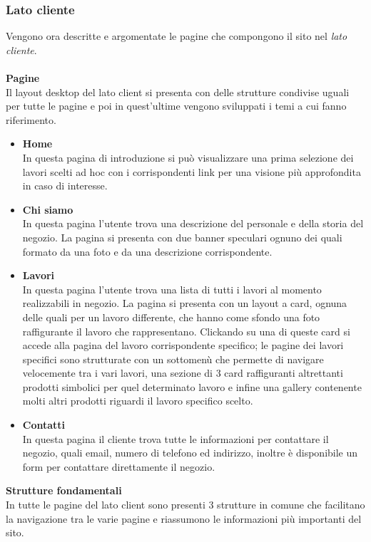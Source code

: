 \subsubsection{Lato cliente}
Vengono ora descritte e argomentate le pagine che compongono il sito nel \textit{lato cliente}.\\\\
\textbf{Pagine}\\
Il layout desktop del lato client si presenta con delle strutture condivise uguali per tutte le pagine e poi in quest'ultime vengono sviluppati i temi a cui fanno riferimento.
	\begin{itemize}
		\item \textbf{Home} \\In questa pagina di introduzione si può visualizzare una prima selezione dei lavori scelti ad hoc con i corrispondenti link per una visione più approfondita in caso di interesse.
		\item \textbf{Chi siamo}\\In questa pagina l'utente trova una descrizione del personale e della storia del negozio. La pagina si presenta con due banner speculari ognuno dei quali formato da una foto e da una descrizione corrispondente.
		\item \textbf{Lavori}\\In questa pagina l'utente trova una lista di tutti i lavori al momento realizzabili in negozio. La pagina si presenta con un layout a card, ognuna delle quali per un lavoro differente, che hanno come sfondo una foto raffigurante il lavoro che rappresentano. Clickando su una di queste card si accede alla pagina del lavoro corrispondente specifico; le pagine dei lavori specifici sono strutturate con un sottomenù che permette di navigare velocemente tra i vari lavori, una sezione di 3 card raffiguranti altrettanti prodotti simbolici per quel determinato lavoro e infine una gallery contenente molti altri prodotti riguardi il lavoro specifico scelto.
	 	\item \textbf{Contatti}\\In questa pagina il cliente trova tutte le informazioni per contattare il negozio, quali email, numero di telefono ed indirizzo, inoltre è disponibile un form per contattare direttamente il negozio.
 	\end{itemize}
\textbf{Strutture fondamentali}\\ 
In tutte le pagine del lato client sono presenti 3 strutture in comune che facilitano la navigazione tra le varie pagine e riassumono le informazioni più importanti del sito.
